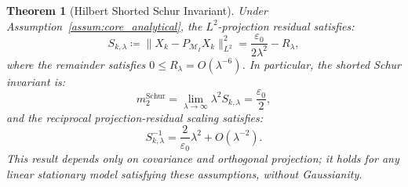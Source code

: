 \documentclass[preprint,12pt]{elsarticle}
\theoremstyle{plain}
\newtheorem{theorem}{Theorem}
\theoremstyle{definition}
\theoremstyle{remark}
\begin{document}
    \begin{theorem}[Hilbert Shorted Schur Invariant]
        \label{thm:inf_cancellation}
        Under Assumption~\ref{assum:core_analytical}, the $L^2$-projection residual satisfies:
        \begin{equation}
            \label{eq:main_schur_sharp}
            S_{k,\lambda} \coloneqq \|X_k - P_{\mathcal{M}_I} X_k\|_{L^2}^2 = \frac{\varepsilon_0}{2\lambda^2} - R_\lambda,
        \end{equation}
        where the remainder satisfies $0 \le R_\lambda = O(\lambda^{-6})$. In particular, the shorted Schur invariant is:
        \begin{equation}
            \label{eq:m2_schur_value}
            m_2^{\mathrm{Schur}} = \lim_{\lambda\to\infty} \lambda^2 S_{k,\lambda} = \frac{\varepsilon_0}{2},
        \end{equation}
        and the reciprocal projection-residual scaling satisfies:
        \begin{equation}
            \label{eq:schur_scaling_inverse}
            S_{k,\lambda}^{-1} = \frac{2}{\varepsilon_0}\lambda^2 + O(\lambda^{-2}).
        \end{equation}
        This result depends only on covariance and orthogonal projection; it holds for any linear stationary model satisfying these assumptions, without Gaussianity.
    \end{theorem}
\end{document}
